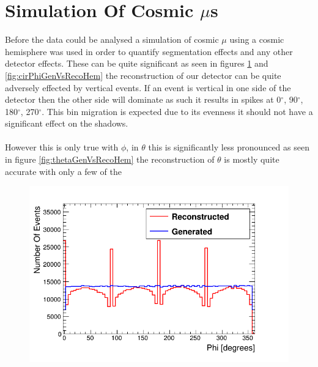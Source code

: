 \section{Simulation Of Cosmic $\mu$s }\label{sec:SimulationOfCosmics}
Before the data could be analysed a simulation of cosmic $\mu$ using a cosmic hemisphere was used in order to quantify segmentation effects and any other detector effects. These can be quite significant as seen in figures \ref{fig:phiGenVsRecoHem} and \ref{fig:cirPhiGenVsRecoHem} the reconstruction of our detector can be quite adversely effected by vertical events. If an event is vertical in one side of the detector then the other side will dominate as such it results in spikes at 0$^\circ$, 90$^\circ$, 180$^\circ$, 270$^\circ$. This bin migration is expected due to its evenness it should not have a significant effect on the shadows. 
\\\\ However this is only true with $\phi$, in $\theta$ this is significantly less pronounced as seen in figure \ref{fig:thetaGenVsRecoHem} the reconstruction of $\theta$ is mostly quite accurate with only a few of the 
\begin{figure}[H]
 \centering
 \includegraphics[width=0.8\linewidth]{Chapter5/Figs/Raster/hemispherePhiCompare.png}
 \label{fig:phiGenVsRecoHem}
\end{figure}

